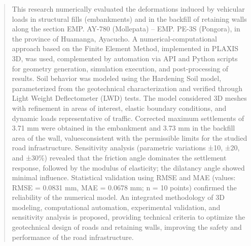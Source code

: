 \begin{quotation}
	\noindent This research numerically evaluated the deformations induced by vehicular loads in structural fills (embankments) and in the backfill of retaining walls along the section EMP. AY-780 (Mollepata) – EMP. PE-3S (Pongora), in the province of Huamanga, Ayacucho. A numerical-computational approach based on the Finite Element Method, implemented in PLAXIS 3D, was used, complemented by automation via API and Python scripts for geometry generation, simulation execution, and post-processing of results. Soil behavior was modeled using the Hardening Soil model, parameterized from the geotechnical characterization and verified through Light Weight Deflectometer (LWD) tests. The model considered 3D meshes with refinement in areas of interest, elastic boundary conditions, and dynamic loads representative of traffic. Corrected maximum settlements of 3.71 mm were obtained in the embankment and 3.73 mm in the backfill area of ​​the wall, values ​​consistent with the permissible limits for the studied road infrastructure. Sensitivity analysis (parametric variations ±10, ±20, and ±30\%) revealed that the friction angle dominates the settlement response, followed by the modulus of elasticity; the dilatancy angle showed minimal influence. Statistical validation using RMSE and MAE (values: RMSE = 0.0831 mm, MAE = 0.0678 mm; n = 10 points) confirmed the reliability of the numerical model. An integrated methodology of 3D modeling, computational automation, experimental validation, and sensitivity analysis is proposed, providing technical criteria to optimize the geotechnical design of roads and retaining walls, improving the safety and performance of the road infrastructure.
	
	

\end{quotation}
